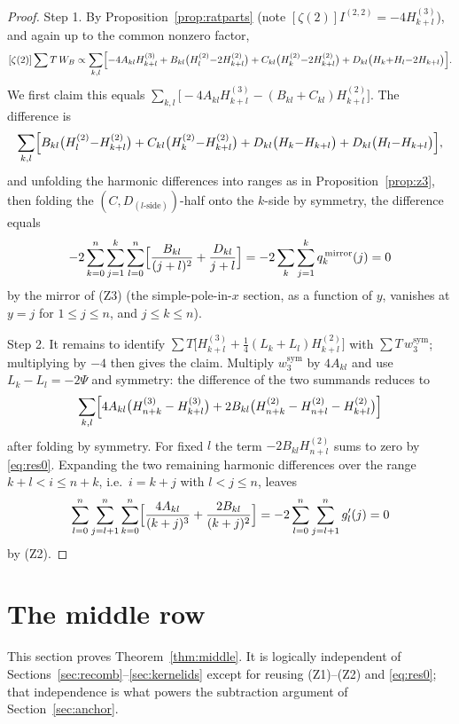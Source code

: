 \documentclass[11pt]{article}
\theoremstyle{remark}
\newcommand{\Hh}[2]{H_{#1}^{(#2)}}
\begin{document}
\begin{proof}
Step 1.  By Proposition~\ref{prop:ratparts} (note
$[\zeta(2)]I^{(2,2)}=-4\Hh{k+l}3$), and again up to the common nonzero
factor,
\[
 [\zeta(2)]\sum T\,W_B
 \propto
 \sum_{k,l}\Bigl[-4A_{kl}\Hh{k+l}3
 +B_{kl}\bigl(\Hh l2{-}2\Hh{k+l}2\bigr)
 +C_{kl}\bigl(\Hh k2{-}2\Hh{k+l}2\bigr)
 +D_{kl}\bigl(H_k{+}H_l{-}2H_{k+l}\bigr)\Bigr].
\]
We first claim this equals
$\sum_{k,l}\bigl[-4A_{kl}\Hh{k+l}3-(B_{kl}+C_{kl})\Hh{k+l}2\bigr]$.
The difference is
\[
 \sum_{k,l}\Bigl[B_{kl}\bigl(\Hh l2{-}\Hh{k+l}2\bigr)
 +C_{kl}\bigl(\Hh k2{-}\Hh{k+l}2\bigr)
 +D_{kl}\bigl(H_k{-}H_{k+l}\bigr)+D_{kl}\bigl(H_l{-}H_{k+l}\bigr)\Bigr],
\]
and unfolding the harmonic differences into ranges as in
Proposition~\ref{prop:z3}, then folding the $(C,D_{(l\text{-side})})$-half
onto the $k$-side by symmetry, the difference equals
\[
 -2\sum_{k=0}^n\sum_{j=1}^{k}\sum_{l=0}^n
 \Bigl[\frac{B_{kl}}{(j+l)^2}+\frac{D_{kl}}{j+l}\Bigr]
 =-2\sum_{k}\sum_{j=1}^{k}q^{\,\mathrm{mirror}}_k(j)=0
\]
by the mirror of (Z3) (the simple-pole-in-$x$ section, as a function of
$y$, vanishes at $y=j$ for $1\le j\le n$, and $j\le k\le n$).

Step 2.  It remains to identify
$\sum T\bigl[\Hh{k+l}3+\tfrac14(L_k+L_l)\Hh{k+l}2\bigr]$
with $\sum T\,w_3^{\mathrm{sym}}$; multiplying by $-4$ then gives the claim.
Multiply $w_3^{\mathrm{sym}}$ by $4A_{kl}$ and use $L_k-L_l=-2\Psi$ and
symmetry: the difference of the two summands reduces to
\[
 \sum_{k,l}\Bigl[4A_{kl}\bigl(\Hh{n+k}3-\Hh{k+l}3\bigr)
 +2B_{kl}\bigl(\Hh{n+k}2-\Hh{n+l}2-\Hh{k+l}2\bigr)\Bigr]
\]
after folding by symmetry.  For fixed $l$ the term $-2B_{kl}\Hh{n+l}2$ sums
to zero by \eqref{eq:res0}.  Expanding the two remaining harmonic
differences over the range $k+l<i\le n+k$, i.e.\ $i=k+j$ with $l<j\le n$,
leaves
\[
 \sum_{l=0}^n\sum_{j=l+1}^{n}\sum_{k=0}^n
 \Bigl[\frac{4A_{kl}}{(k+j)^3}+\frac{2B_{kl}}{(k+j)^2}\Bigr]
 =-2\sum_{l=0}^n\sum_{j=l+1}^{n}g_l'(j)=0
\]
by (Z2).
\end{proof}

\section{The middle row}\label{sec:middle}

This section proves Theorem~\ref{thm:middle}.  It is logically independent
of Sections~\ref{sec:recomb}--\ref{sec:kernelids} except for reusing
(Z1)--(Z2) and \eqref{eq:res0}; that independence is what powers the
subtraction argument of Section~\ref{sec:anchor}.
\end{document}
